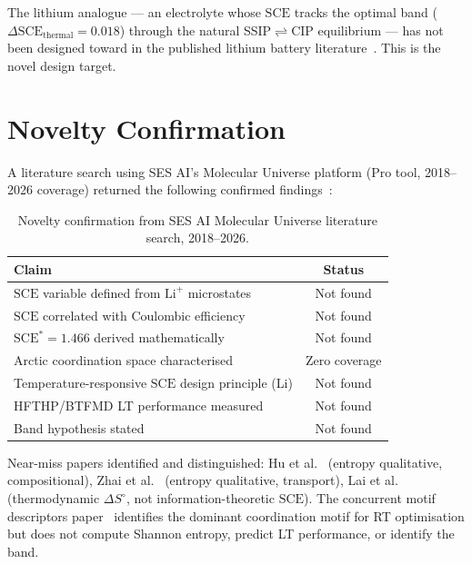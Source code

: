\documentclass[12pt,letterpaper]{article}
\newcommand{\mSCE}{\mathrm{SCE}}
\newcommand{\mSCEstar}{\mathrm{SCE}^{*}}
\begin{document}
The lithium analogue --- an electrolyte whose $\mSCE$
tracks the optimal band
($\Delta\mSCE_{\mathrm{thermal}} = 0.018$) through
the natural SSIP$\rightleftharpoons$CIP equilibrium ---
has not been designed toward in the published lithium
battery literature~\cite{mu2026query7}.
This is the novel design target.

\section{Novelty Confirmation}
\label{sec:novelty}

A literature search using SES AI's Molecular Universe
platform (Pro tool, 2018--2026 coverage) returned the
following confirmed findings~\cite{mu2026query5}:

\begin{table}[h!]
\centering
\caption{Novelty confirmation from SES AI Molecular
Universe literature search, 2018--2026.}
\label{tab:novelty}
\begin{tabularx}{\textwidth}{Xc}
\toprule
Claim & Status \\
\midrule
$\mSCE$ variable defined from
$\mathrm{Li}^{+}$ microstates
& Not found \\
$\mSCE$ correlated with Coulombic efficiency
& Not found \\
$\mSCEstar = 1.466$ derived mathematically
& Not found \\
Arctic coordination space characterised
& Zero coverage \\
Temperature-responsive $\mSCE$ design
principle (Li)
& Not found \\
HFTHP/BTFMD LT performance measured
& Not found \\
Band hypothesis stated
& Not found \\
\bottomrule
\end{tabularx}
\end{table}

\noindent Near-miss papers identified and distinguished:
Hu et al.~\cite{hu2025} (entropy qualitative,
compositional),
Zhai et al.~\cite{zhai2025} (entropy qualitative,
transport),
Lai et al.~\cite{lai2025jacs} (thermodynamic
$\Delta S^{\circ}$, not information-theoretic $\mSCE$).
The concurrent motif descriptors
paper~\cite{natcomm2025motif} identifies the dominant
coordination motif for RT optimisation but does not
compute Shannon entropy, predict LT performance, or
identify the band.
\end{document}
